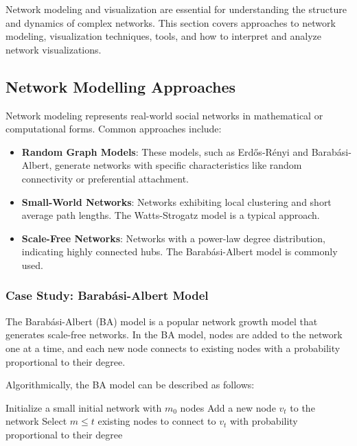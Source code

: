 \documentclass[12pt]{book} %
\begin{document}
Network modeling and visualization are essential for understanding the structure and dynamics of complex networks. This section covers approaches to network modeling, visualization techniques, tools, and how to interpret and analyze network visualizations.

\subsection{Network Modelling Approaches}

Network modeling represents real-world social networks in mathematical or computational forms. Common approaches include:

\begin{itemize}
    \item \textbf{Random Graph Models}: These models, such as Erdős-Rényi and Barabási-Albert, generate networks with specific characteristics like random connectivity or preferential attachment.
    
    \item \textbf{Small-World Networks}: Networks exhibiting local clustering and short average path lengths. The Watts-Strogatz model is a typical approach.
    
    \item \textbf{Scale-Free Networks}: Networks with a power-law degree distribution, indicating highly connected hubs. The Barabási-Albert model is commonly used.
\end{itemize}

\subsubsection{Case Study: Barabási-Albert Model}

The Barabási-Albert (BA) model is a popular network growth model that generates scale-free networks. In the BA model, nodes are added to the network one at a time, and each new node connects to existing nodes with a probability proportional to their degree.

Algorithmically, the BA model can be described as follows:
\FloatBarrier
\begin{algorithm}
\caption{Barabási-Albert Model}\label{alg:ba-model}
\begin{algorithmic}[1]
\State Initialize a small initial network with \(m_0\) nodes
    \State Add a new node \(v_t\) to the network
    \State Select \(m \leq t\) existing nodes to connect to \(v_t\) with probability proportional to their degree
\EndFor
\end{algorithmic}
\end{algorithm}
\FloatBarrier
\end{document}
